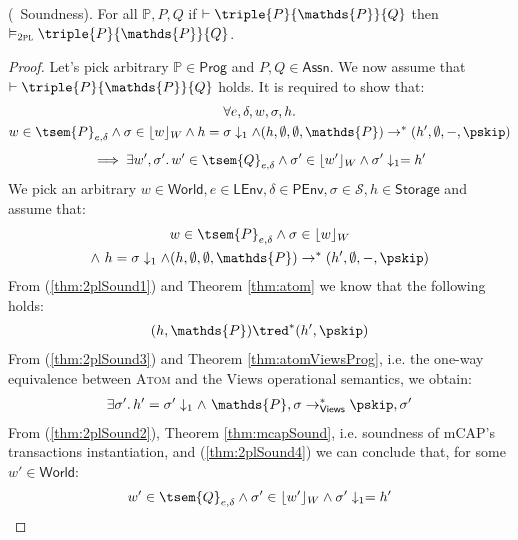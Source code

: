 \begin{thm}
	\label{thm:2plSound}
	(\tpl\ Soundness).
	For all $\mathds{P}, P, Q$ if $\vdash \triple{P}{\mathds{P}}{Q}$ then $\vDash_\textsc{2pl} \triple{P}{\mathds{P}}{Q}$.
	\begin{proof}
		Let's pick arbitrary $\mathds{P} \in \mathsf{Prog}$ and $P, Q \in \mathsf{Assn}$. We now assume that $\vdash \triple{P}{\mathds{P}}{Q}$ holds. It is required to show that:
		\begin{gather}
			\forall e, \delta, w, \sigma, h \ldotp \\
			w \in \tsem{P}_{e, \delta} \land \sigma \in \lfloor w \rfloor_W \land h = \sigma \downarrow_1 \land (h, \emptyset, \emptyset, \mathds{P}) \rightarrow^* (h', \emptyset, -, \pskip) \\[0.4em]
			\implies \exists w', \sigma' \ldotp w' \in \tsem{Q}_{e, \delta} \land \sigma' \in \lfloor w' \rfloor_W \land \sigma' \downarrow_1 = h'
		\end{gather}
		We pick an arbitrary $w \in \mathsf{World}, e \in \mathsf{LEnv}, \delta \in \mathsf{PEnv}, \sigma \in \mathcal{S}, h \in \mathsf{Storage}$ and assume that:
		\begin{gather}
			\label{thm:2plSound2} w \in \tsem{P}_{e, \delta} \land \sigma \in \lfloor w \rfloor_W \\
			\label{thm:2plSound1} \land\ h = \sigma \downarrow_1 \land (h, \emptyset, \emptyset, \mathds{P}) \rightarrow^* (h', \emptyset, -, \pskip)
		\end{gather}
		From (\ref{thm:2plSound1}) and Theorem \ref{thm:atom} we know that the following holds:
		\begin{gather}
			\label{thm:2plSound3}
			(h, \mathds{P}) \tred^* (h', \pskip)
		\end{gather}
		From (\ref{thm:2plSound3}) and Theorem \ref{thm:atomViewsProg}, i.e. the one-way equivalence between \textsc{Atom} and the Views operational semantics, we obtain:
		\begin{gather}
			\label{thm:2plSound4}
			\exists \sigma' \ldotp h' = \sigma' \downarrow_1 \land\ \mathds{P}, \sigma \rightarrow^*_{\mathsf{Views}} \pskip, \sigma'
		\end{gather}
		From (\ref{thm:2plSound2}), Theorem \ref{thm:mcapSound}, i.e. soundness of mCAP's transactions instantiation, and (\ref{thm:2plSound4}) we can conclude that, for some $w' \in \mathsf{World}$:
		\[
			w' \in \tsem{Q}_{e, \delta} \land \sigma' \in \lfloor w' \rfloor_W \land \sigma' \downarrow_1 = h'
		\]
	\end{proof}
\end{thm}